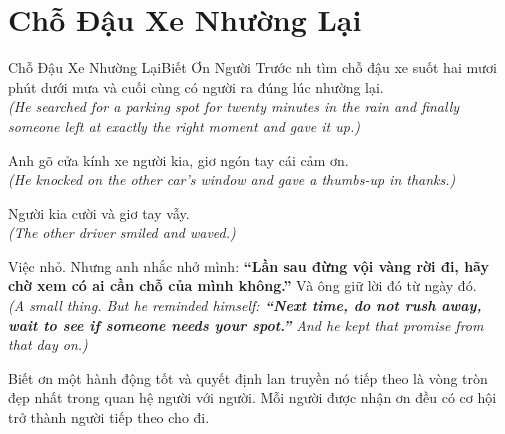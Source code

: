 \section{Chỗ Đậu Xe Nhường Lại}
\begin{truyen}{Chỗ Đậu Xe Nhường Lại}{Biết Ơn Người Trước}
nh tìm chỗ đậu xe suốt hai mươi phút dưới mưa và cuối cùng có người ra đúng lúc nhường lại.\\
\textit{(He searched for a parking spot for twenty minutes in the rain and finally someone left at exactly the right moment and gave it up.)}

Anh gõ cửa kính xe người kia, giơ ngón tay cái cảm ơn.\\
\textit{(He knocked on the other car's window and gave a thumbs-up in thanks.)}

Người kia cười và giơ tay vẫy.\\
\textit{(The other driver smiled and waved.)}

Việc nhỏ. Nhưng anh nhắc nhở mình: \textbf{``Lần sau đừng vội vàng rời đi, hãy chờ xem có ai cần chỗ của mình không.''} Và ông giữ lời đó từ ngày đó.\\
\textit{(A small thing. But he reminded himself: \textbf{``Next time, do not rush away, wait to see if someone needs your spot.''} And he kept that promise from that day on.)}
\end{truyen}
\begin{baihoc}
  Biết ơn một hành động tốt và quyết định lan truyền nó tiếp theo là vòng tròn đẹp nhất trong quan hệ người với người. Mỗi người được nhận ơn đều có cơ hội trở thành người tiếp theo cho đi.
\end{baihoc}

